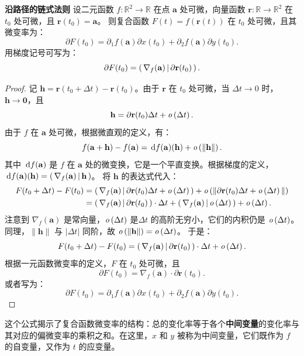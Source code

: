 \documentclass[12pt,UTF8,fontset=none]{ctexbook}
\begin{document}
\begin{tm}{\textbf{沿路径的链式法则}}
设二元函数 $f: \mathbb{R}^2 \to \mathbb{R}$ 在点 $\mathbf{a}$ 处可微，向量函数 $\mathbf{r}: \mathbb{R} \to \mathbb{R}^2$ 在 $t_0$ 处可微，且 $\mathbf{r}(t_0) = \mathbf{a}$。
则复合函数 $F(t) = f(\mathbf{r}(t))$ 在 $t_0$ 处可微，且其微变率为：
$$ \partial F(t_0) = \partial_1 f(\mathbf{a}) \partial x(t_0) + \partial_2 f(\mathbf{a}) \partial y(t_0). $$
用梯度记号可写为：
$$ \partial F(t_0) = \displaystyle\left( \,\nabla_f(\mathbf{a}) \,\middle\vert \,\partial \mathbf{r}(t_0) \,\right). $$
\end{tm}
\begin{proof}
记 $\mathbf{h} = \mathbf{r}(t_0 + \Delta t) - \mathbf{r}(t_0)$。由于 $\mathbf{r}$ 在 $t_0$ 处可微，当 $\Delta t \to 0$ 时，$\mathbf{h} \to \mathbf{0}$，且
$$ \mathbf{h} = \partial \mathbf{r}(t_0) \Delta t + \mathit{o}\left(\Delta t\right). $$
由于 $f$ 在 $\mathbf{a}$ 处可微，根据微直观的定义，有：
$$ f(\mathbf{a} + \mathbf{h}) - f(\mathbf{a}) = \,\mathrm{d} f(\mathbf{a})(\mathbf{h}) + \mathit{o}\left(\|\mathbf{h}\|\right). $$
其中 $\,\mathrm{d} f(\mathbf{a})$ 是 $f$ 在 $\mathbf{a}$ 处的微变换，它是一个平直变换。根据梯度的定义，$\,\mathrm{d} f(\mathbf{a})(\mathbf{h}) = \displaystyle\left( \,\nabla_f(\mathbf{a}) \,\middle\vert \,\mathbf{h} \,\right)$。
将 $\mathbf{h}$ 的表达式代入：
\begin{align*}
F(t_0 + \Delta t) - F(t_0) &= \displaystyle\left( \,\nabla_f(\mathbf{a}) \,\middle\vert \,\partial \mathbf{r}(t_0) \Delta t + \mathit{o}\left(\Delta t\right) \,\right) + \mathit{o}\left(\|\partial \mathbf{r}(t_0) \Delta t + \mathit{o}\left(\Delta t\right)\|\right) \\
&= \displaystyle\left( \,\nabla_f(\mathbf{a}) \,\middle\vert \,\partial \mathbf{r}(t_0) \,\right)\cdot \Delta t +  \displaystyle\left( \,\nabla_f(\mathbf{a}) \,\middle\vert \, \mathit{o}\left(\Delta t\right) \,\right) + \mathit{o}\left(\Delta t\right).
\end{align*}
注意到 $\nabla_f(\mathbf{a})$ 是常向量，$\mathit{o}\left(\Delta t\right)$ 是$\Delta t$ 的高阶无穷小，它们的内积仍是 $\mathit{o}\left(\Delta t\right)$。同理，$\|\mathbf{h}\|$ 与 $|\Delta t|$ 同阶，故 $\mathit{o}\left(\|\mathbf{h}\|\right) = \mathit{o}\left(\Delta t\right)$。
于是：
$$ F(t_0 + \Delta t) - F(t_0) = \displaystyle\left( \,\nabla_f(\mathbf{a}) \,\middle\vert \,\partial \mathbf{r}(t_0) \,\right)\cdot \Delta t + \mathit{o}\left(\Delta t\right). $$
根据一元函数微变率的定义，$F$ 在 $t_0$ 处可微，且
$$ \partial F(t_0) = \nabla_f(\mathbf{a}) \cdot \partial \mathbf{r}(t_0). $$
或者写为：
$$ \partial F(t_0) = \partial_1 f(\mathbf{a}) \partial x(t_0) + \partial_2 f(\mathbf{a}) \partial y(t_0). $$
\end{proof}

这个公式揭示了复合函数微变率的结构：总的变化率等于各个\textbf{中间变量}的变化率与其对应的偏微变率的乘积之和。在这里，$x$ 和 $y$ 被称为中间变量，它们既作为 $f$ 的自变量，又作为 $t$ 的应变量。

\end{document}
